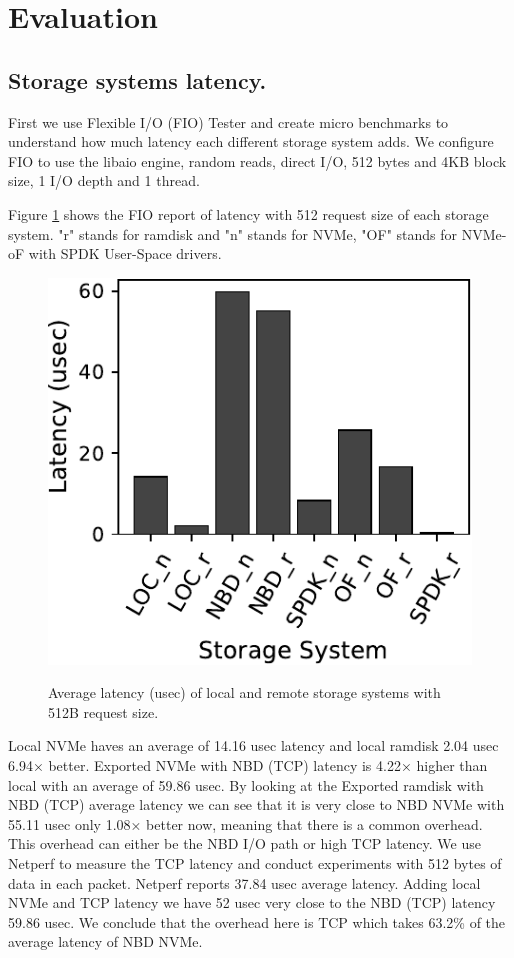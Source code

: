\section{Evaluation}
\subsection{Storage systems latency.}
\par First we use Flexible I/O (FIO) Tester and create micro benchmarks to understand how much latency each different storage system adds. We configure FIO to use the libaio engine, random reads, direct I/O, 512 bytes and 4KB block size, 1 I/O depth and 1 thread.
\par Figure \ref{fig:fio_512} shows the FIO report of latency with 512 request size of each storage system. "r" stands for ramdisk and "n" stands for NVMe, "OF" stands for NVMe-oF with SPDK User-Space drivers.
\begin{figure}[H]
  \includegraphics[width=\linewidth]{figures/fio_512.pdf}\\
\caption{Average latency (usec) of local and remote storage systems with 512B request size.}
\label{fig:fio_512}
\end{figure}
Local NVMe haves an average of 14.16 usec latency and local ramdisk 2.04 usec 6.94× better. Exported NVMe with NBD (TCP) latency is 4.22× higher than local with an average of 59.86 usec. By looking at the Exported ramdisk with NBD (TCP) average latency we can see that it is very close to NBD NVMe with 55.11 usec only 1.08× better now, meaning that there is a common overhead. This overhead can either be the NBD I/O path or high TCP latency. We use Netperf to measure the TCP latency and conduct experiments with 512 bytes of data in each packet. Netperf reports 37.84 usec average latency. Adding local NVMe and TCP latency we have 52 usec very close to the NBD (TCP) latency 59.86 usec. We conclude that the overhead here is TCP which takes 63.2\% of the average latency of NBD NVMe. 
